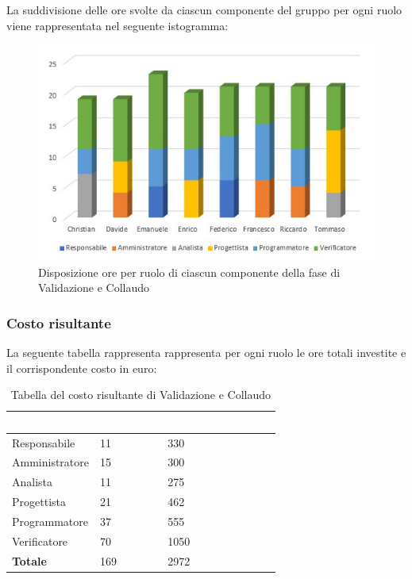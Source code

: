 La suddivisione delle ore svolte da ciascun componente del gruppo per ogni ruolo viene rappresentata nel seguente istogramma:
\begin{figure}[h!]
	\centering
	\includegraphics{Sezioni/Istogrammi/IstogrammaValidazione.png}
	\caption{Disposizione ore per ruolo di ciascun componente della fase di Validazione e Collaudo}
\end{figure}

\clearpage

\subsubsection{Costo risultante}
La seguente tabella rappresenta rappresenta per ogni ruolo le ore totali investite e il corrispondente costo in euro:
{
\renewcommand{\arraystretch}{2}
\begin{longtable}{ C{3cm} C{2cm} C{4cm}}
\caption{Tabella del costo risultante di Validazione e Collaudo}\\

\textcolor{white}{\textbf{Ruolo}} & 
\textcolor{white}{\textbf{Totale ore}} & 
\textcolor{white}{\textbf{Costo ruolo (in \euro{})}}\\	
\endhead
        
Responsabile    &  11 &  330 \\
Amministratore  &  15 &  300 \\
Analista        &  11 &  275 \\
Progettista     &  21 &  462 \\
Programmatore   &  37 &  555 \\
Verificatore    &  70 & 1050 \\
\textbf{Totale} & 169 & 2972 \\
	
\end{longtable}
}

